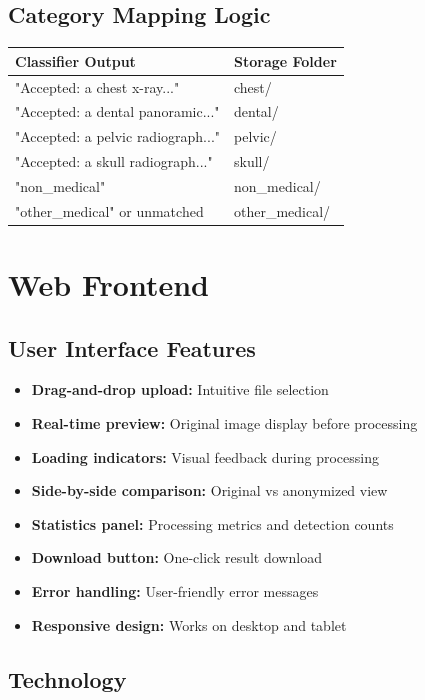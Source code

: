 \documentclass[12pt,a4paper]{article}
\begin{document}
\subsection{Category Mapping Logic}

\begin{tabular}{p{6cm} p{6cm}}
\toprule
\textbf{Classifier Output} & \textbf{Storage Folder} \\
\midrule
"Accepted: a chest x-ray..." & chest/ \\
"Accepted: a dental panoramic..." & dental/ \\
"Accepted: a pelvic radiograph..." & pelvic/ \\
"Accepted: a skull radiograph..." & skull/ \\
"non\_medical" & non\_medical/ \\
"other\_medical" or unmatched & other\_medical/ \\
\bottomrule
\end{tabular}

\section{Web Frontend}

\subsection{User Interface Features}

\begin{itemize}[leftmargin=1.2cm]
    \item \textbf{Drag-and-drop upload:} Intuitive file selection
    \item \textbf{Real-time preview:} Original image display before processing
    \item \textbf{Loading indicators:} Visual feedback during processing
    \item \textbf{Side-by-side comparison:} Original vs anonymized view
    \item \textbf{Statistics panel:} Processing metrics and detection counts
    \item \textbf{Download button:} One-click result download
    \item \textbf{Error handling:} User-friendly error messages
    \item \textbf{Responsive design:} Works on desktop and tablet
\end{itemize}

\subsection{Technology}
\end{document}
